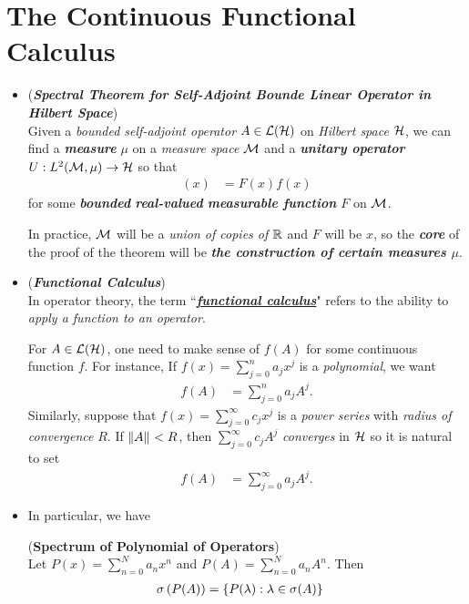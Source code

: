 \documentclass[11pt]{article}
\begin{document}
\section{The Continuous Functional Calculus}
\begin{itemize}
\item \begin{remark}  (\textbf{\emph{Spectral Theorem for Self-Adjoint Bounde Linear Operator in Hilbert Space}})\\ 
Given a \emph{bounded self-adjoint operator} $A \in {\mathcal L}({\mathcal H})$ on \emph{Hilbert space} ${\mathcal H}$, we can find a \emph{\textbf{measure}} $\mu$ on a \emph{measure space ${\mathcal M}$} and a 
\emph{\textbf{unitary operator}} $U: L^2({\mathcal M}, \mu) \to {\mathcal H} $ so that 
\begin{align*}
[U^{-1} A U f](x) &= F(x) f(x)
\end{align*} for some \emph{\textbf{bounded} \textbf{real-valued} \textbf{measurable function} $F$} on ${\mathcal M}$. 

In practice, ${\mathcal M}$ will be a \emph{union of copies of ${\mathbb R}$} and $F$ will be $x$,  so the \emph{\textbf{core}} of the proof of the theorem will be \emph{\textbf{the construction of certain measures $\mu$}}.  
\end{remark}

\item \begin{remark} (\emph{\textbf{Functional Calculus}}) \citep{borthwick2020spectral} \\
In operator theory, the term ``\underline{\emph{\textbf{functional calculus}}}" refers to the ability to \emph{apply a function to an operator}.

For $A \in {\mathcal L}({\mathcal H})$, one need to make sense of $f(A)$ for some continuous function $f$. For instance, If $f(x) = \sum_{j=0}^{n}a_j x^j$ is a \emph{polynomial}, 
we want 
\begin{align*}
f(A) &=  \sum_{j=0}^{n}a_j A^j.
\end{align*} Similarly, suppose that $f(x) = \sum_{j=0}^{\infty}c_j x^j$  is a \emph{power series} with \emph{radius of convergence} $R$. If $\left\|A\right\|_{} < R$, then $ \sum_{j=0}^{\infty}c_j A^j$ \emph{converges} in ${\mathcal H}$ so it is natural to set 
\begin{align*}
f(A) &=  \sum_{j=0}^{\infty}a_j A^j.
\end{align*}
\end{remark}

\item In particular, we have
\begin{lemma} \label{lem: poly_spectrum} (\textbf{Spectrum of Polynomial of Operators}) \citep{reed1980methods}\\
Let $P(x) = \sum_{n=0}^{N}a_n x^n$ and $P(A) =  \sum_{n=0}^{N}a_n A^n$. Then 
\begin{align*}
\sigma\left(P(A)\right) &= \left\{P(\lambda): \lambda \in \sigma(A)\right\}
\end{align*}
\end{lemma}


\end{itemize}
\end{document}
